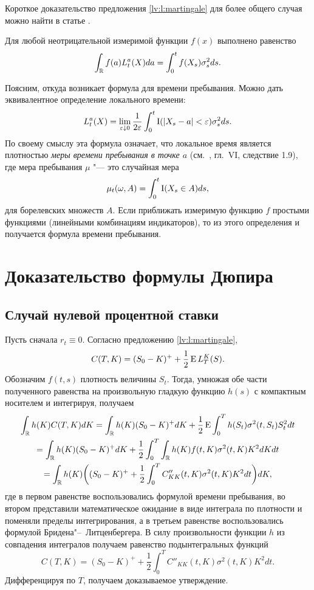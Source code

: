 Короткое доказательство предложения \ref{lv:l:martingale} для более общего случая можно найти в статье \cite{HamzaKlebaner22}. 


\begin{proposition}
Для любой неотрицательной измеримой функции $f(x)$ выполнено равенство
\[
\int_{\mathbb{R}} f(a) L_t^a(X) da = \int_0^t f(X_s) \sigma_s^2 ds.
\]  
\end{proposition}

\begin{remark}
Поясним, откуда возникает формула для времени пребывания.
Можно дать эквивалентное определение локального времени:
\[
L_t^a(X) = \lim_{\varepsilon\downarrow 0} \frac{1}{2\varepsilon} \int_0^t \operatorname{I}(|X_s-a|< \varepsilon) \sigma^2_s ds.
\]
По своему смыслу эта формула означает, что локальное время является плотностью \emph{меры времени пребывания в точке $a$} (см.~\cite{RevuzYor}, гл.~VI, следствие 1.9), где мера пребывания $\mu$ "--- это случайная мера 
\[
\mu_t(\omega, A) = \int_0^t \operatorname{I}(X_s \in A) ds,
\] 
для борелевских множеств $A$.
Если приближать измеримую функцию $f$ простыми функциями (линейными комбинациям индикаторов), то из этого определения и получается формула времени пребывания.
\end{remark}


\section{Доказательство формулы Дюпира}
\subsection{Случай нулевой процентной ставки}

Пусть сначала $r_t\equiv 0$.
Согласно предложению \ref{lv:l:martingale}, 
\[
C(T,K) = (S_0-K)^+ + \frac 12 \operatorname{E} L_T^K(S).
\]
Обозначим $f(t,s)$ плотность величины $S_t$.
Тогда, умножая обе части полученного равенства на произвольную гладкую функцию $h(s)$ с компактным носителем и интегрируя, получаем
\begin{multline*}
\int_{\mathbb{R}} h(K) C(T,K) dK 
= \int_{\mathbb{R}} h(K)(S_0-K)^+  dK + \frac12 \operatorname{E} \int_0^T h(S_t) \sigma^2(t,S_t) S_t^2 dt \\
=\int_{\mathbb{R}} h(K)(S_0-K)^+  dK + \frac12 \int_0^T \int_{\mathbb{R}} h(K)f(t,K) \sigma^2(t,K)K^2 dK dt \\
= \int_{\mathbb{R}} h(K) 
  \biggl(
    (S_0-K)^+ + \frac12\int_0^T C''_{KK}(t,K) \sigma^2(t,K)K^2 dt
  \biggr) dK,
\end{multline*}
где в первом равенстве воспользовались формулой времени пребывания, во втором представили математическое ожидание в виде интеграла по плотности и поменяли пределы интегрирования, а в третьем равенстве воспользовались формулой Бридена"--~Литценбергера.
В силу произвольности функции $h$ из совпадения интегралов получаем равенство подынтегральных функций
\[
C(T,K) = (S_0-K)^+ + \frac12 \int_0^T C''_{KK}(t,K) \sigma^2(t,K) K^2dt.
\]
Дифференцируя по $T$, получаем доказываемое утверждение.

